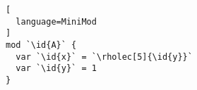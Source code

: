 \begin{lstlisting}[
  language=MiniMod
]
mod `\id{A}` {
  var `\id{x}` = `\rholec[5]{\id{y}}`
  var `\id{y}` = 1
}
\end{lstlisting}
\hspace{1em}